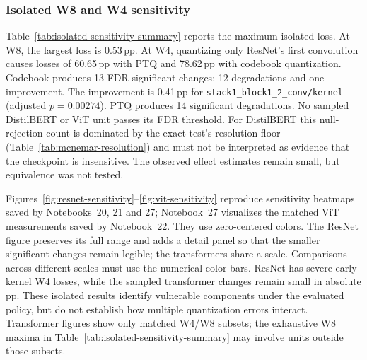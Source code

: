 \documentclass[conference]{IEEEtran}
\newcommand{\pp}{\,pp}
\begin{document}
\subsubsection{Isolated W8 and W4 sensitivity}

Table~\ref{tab:isolated-sensitivity-summary} reports the maximum isolated loss. At W8, the largest loss is 0.53\pp{}. At W4, quantizing only ResNet's first convolution causes losses of 60.65\pp{} with PTQ and 78.62\pp{} with codebook quantization. Codebook produces 13 FDR-significant changes: 12 degradations and one improvement. The improvement is 0.41\pp{} for \texttt{stack1\_block1\_2\_conv/kernel} (adjusted $p=0.00274$). PTQ produces 14 significant degradations. No sampled DistilBERT or ViT unit passes its FDR threshold. For DistilBERT this null-rejection count is dominated by the exact test's resolution floor (Table~\ref{tab:mcnemar-resolution}) and must not be interpreted as evidence that the checkpoint is insensitive. The observed effect estimates remain small, but equivalence was not tested.

Figures~\ref{fig:resnet-sensitivity}--\ref{fig:vit-sensitivity} reproduce sensitivity heatmaps saved by Notebooks~20, 21 and 27; Notebook~27 visualizes the matched ViT measurements saved by Notebook~22. They use zero-centered colors. The ResNet figure preserves its full range and adds a detail panel so that the smaller significant changes remain legible; the transformers share a scale. Comparisons across different scales must use the numerical color bars. ResNet has severe early-kernel W4 losses, while the sampled transformer changes remain small in absolute pp. These isolated results identify vulnerable components under the evaluated policy, but do not establish how multiple quantization errors interact. Transformer figures show only matched W4/W8 subsets; the exhaustive W8 maxima in Table~\ref{tab:isolated-sensitivity-summary} may involve units outside those subsets.
\end{document}
